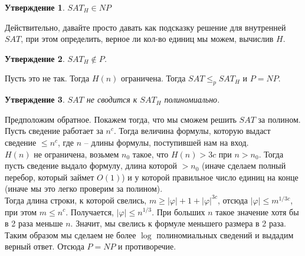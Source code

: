 \documentclass[12pt, letterpaper]{article}
\newtheorem{prop}{Утверждение}[section]
\newcommand{\ph}{\varphi}
\newcommand{\leqp}{\leq_{p}}
\begin{document}
\begin{prop}
$SAT_H \in NP$
\end{prop}
Действительно, давайте просто давать как подсказку решение для внутренней $SAT$, при этом определить, верное ли кол-во единиц мы можем, вычислив $H$.

\begin{prop}
$SAT_H \notin P$. 
\end{prop}
Пусть это не так. Тогда $H(n)$ ограничена. Тогда $SAT \leqp SAT_H$ и $P=NP$.

\begin{prop}
$SAT$ не сводится к $SAT_H$ полиномиально.
\end{prop}
Предположим обратное. Покажем тогда, что мы сможем решить $SAT$ за полином. Пусть сведение работает за $n^c$. Тогда величина формулы, которую выдаст сведение $\leq n^c$, где $n$ -- длины формулы, поступившей нам на вход. \\
$H(n)$ не ограничена, возьмем $n_0$ такое, что $H(n) > 3c$ при $n > n_0$. Тогда пусть сведение выдало формулу, длина которой $> n_0$ (иначе сделаем полный перебор, который займет $O(1)$) и у которой правильное число единиц на конце (иначе мы это легко проверим за полином).\\
Тогда длина строки, к которой свелись, $m \geq |\ph| + 1 + |\ph|^{3c}$, отсюда $|\ph| \leq m^{1/3c}$, при этом $m \leq n^c$. Получается, $|\ph| \leq n^{1/3}$. При больших $n$ такое значение хотя бы в 2 раза меньше $n$. Значит, мы свелись к формуле меньшего размера в 2 раза. Таким образом мы сделаем не более $\log$ полиномиальных сведений и выдадим верный ответ. Отсюда $P = NP$ и противоречие.
\end{document}
